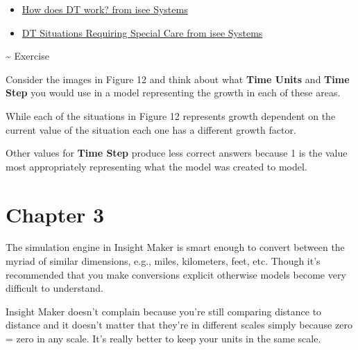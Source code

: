 \documentclass[]{memoir}
\renewcommand{\u}[1]{\textbf{#1}}
\begin{document}
\begin{itemize}
\itemsep1pt\parskip0pt
\item
  \href{http://www.iseesystems.com/Helpv9/Content/DT/How_does_DT_work_.htm}{How
  does DT work? from isee Systems}
\item
  \href{http://www.iseesystems.com/Helpv9/Content/DT/DT_Special_Care.htm}{DT
  Situations Requiring Special Care from isee Systems}
\end{itemize}

\textasciitilde{} Exercise

Consider the images in Figure 12 and think about what \u{Time Units} and
\u{Time Step} you would use in a model representing the growth in each
of these areas.


While each of the situations in Figure 12 represents growth dependent on
the current value of the situation each one has a different growth
factor.


Other values for \u{Time Step} produce less correct answers because 1 is
the value most appropriately representing what the model was created to
model.

\section{Chapter 3}


The simulation engine in Insight Maker is smart enough to convert
between the myriad of similar dimensions, e.g., miles, kilometers, feet,
etc. Though it's recommended that you make conversions explicit
otherwise models become very difficult to understand.

Insight Maker doesn't complain because you're still comparing distance
to distance and it doesn't matter that they're in different scales
simply because zero = zero in any scale. It's really better to keep your
units in the same scale.
\end{document}
